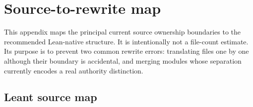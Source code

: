 \documentclass[10pt,letterpaper,oneside]{report}
\begin{document}
\appendix

\chapter{Source-to-rewrite map}\label{app:source-map}

This appendix maps the principal current source ownership boundaries to the recommended Lean-native structure. It is intentionally not a file-count estimate. Its purpose is to prevent two common rewrite errors: translating files one by one although their boundary is accidental, and merging modules whose separation currently encodes a real authority distinction.

\section{Leant source map}
\end{document}
